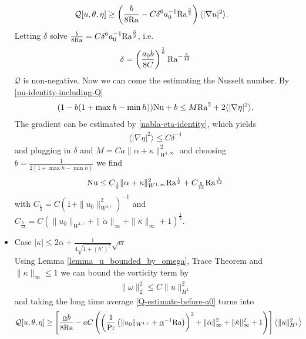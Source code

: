 \documentclass{article}
\theoremstyle{definition}
\theoremstyle{definition}
\newcommand{\Pra}{\rm{Pr}}
\newcommand{\Ra}{{\rm{Ra}}}
\newcommand{\Nu}{{\rm{Nu}}}
\begin{document}
\begin{itemize}
\begin{align*}
            \mathcal{Q}[u,\theta,\eta]
            &\geq \left(\frac{b}{8\Ra} - C\delta^6 a_0^{-1}\Ra^\frac{3}{2}\right)\langle |\nabla u|^2\rangle.
        \end{align*}
        Letting $\delta$ solve $\frac{b}{8\Ra}= C \delta^6 a_0^{-1}\Ra^\frac{3}{2}$, i.e.
        \begin{align*}
            \delta = \left(\frac{a_0 b}{8C}\right)^\frac{1}{6}\Ra^{-\frac{5}{12}}
        \end{align*}
        $\mathcal{Q}$ is non-negative. Now we can come the estimating the Nusselt number. By \eqref{nu-identity-including-Q}
        \begin{align*}
            (1-b(1+\max h -\min h))\Nu + b \leq M \Ra^2 + 2\langle |\nabla \eta|^2\rangle.
        \end{align*}
        The gradient can be estimated by \eqref{nabla-eta-identity}, which yields
        \begin{align*}
            \langle |\nabla \eta|^2\rangle \leq C \delta^{-1}
        \end{align*}
        and plugging in $\delta$ and $M=C a\|\alpha+\kappa\|_{W^{1,\infty}}^2$ and choosing $b = \frac{1}{2(1+\max h - \min h)}$ we find
        \begin{align*}
            \Nu \leq C_\frac{1}{2} \|\alpha+\kappa\|_{W^{1,\infty}}^2 \Ra^\frac{1}{2} + C_\frac{5}{12} \Ra^\frac{5}{12}
        \end{align*}
        with $C_\frac{1}{2} = C(1+\|u_0\|_{W^{1,r}}^2)^{-1}$ and $C_\frac{5}{12} = C \left(\|u_0\|_{W^{1,r}}+\|\dot\alpha\|_\infty+\|\dot\kappa\|_\infty+1\right)^\frac{1}{3}$.
    \item Case $|\kappa|\leq 2\alpha + \frac{1}{4\sqrt{1+(h')^2}}\sqrt{\alpha}$\vspace{10pt}\\
        Using Lemma \ref{lemma_u_bounded_by_omega}, Trace Theorem and $\|\kappa\|_\infty \leq 1$ we can bound the vorticity term by
        \begin{align*}
            \|\omega\|_2^2 \leq C \|u\|_{H^1}^2
        \end{align*}
        and taking the long time average \eqref{Q-estimate-before-a0} turns into
        \begin{align*}
            \mathcal{Q}[u,\theta,\eta] &\geq \left[\frac{\underline{\alpha} b}{8\Ra} - a C\left(\left(\frac{1}{\Pra}\left(\|u_0\|_{W^{1,r}} +\underline{\alpha}^{-1}\Ra\right)\right)^2+\|\dot\alpha\|_\infty^2+\|\dot\kappa\|_\infty^2+1\right) \right]\left\langle\|u\|_{H^1}^2\right\rangle

\end{align*}
\end{itemize}
\end{document}
